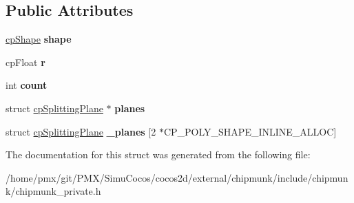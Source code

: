 \subsection*{Public Attributes}
\begin{DoxyCompactItemize}
\item 
\mbox{\label{structcpPolyShape_ac012e90aea902a2148bd5b43028d2e33}} 
\hyperlink{structcpShape}{cp\+Shape} {\bfseries shape}
\item 
\mbox{\label{structcpPolyShape_adeca191bc792ac86ad2e0e4b454ddbd3}} 
cp\+Float {\bfseries r}
\item 
\mbox{\label{structcpPolyShape_abfb92a30816b97bfc1bb34fb7246c26d}} 
int {\bfseries count}
\item 
\mbox{\label{structcpPolyShape_a14bf353f8de06fddaf05e2234b6ade19}} 
struct \hyperlink{structcpSplittingPlane}{cp\+Splitting\+Plane} $\ast$ {\bfseries planes}
\item 
\mbox{\label{structcpPolyShape_a8d321884a9fb33de94309280b9b1d348}} 
struct \hyperlink{structcpSplittingPlane}{cp\+Splitting\+Plane} {\bfseries \+\_\+planes} \mbox{[}2 $\ast$C\+P\+\_\+\+P\+O\+L\+Y\+\_\+\+S\+H\+A\+P\+E\+\_\+\+I\+N\+L\+I\+N\+E\+\_\+\+A\+L\+L\+OC\mbox{]}
\end{DoxyCompactItemize}


The documentation for this struct was generated from the following file\+:\begin{DoxyCompactItemize}
\item 
/home/pmx/git/\+P\+M\+X/\+Simu\+Cocos/cocos2d/external/chipmunk/include/chipmunk/chipmunk\+\_\+private.\+h\end{DoxyCompactItemize}
